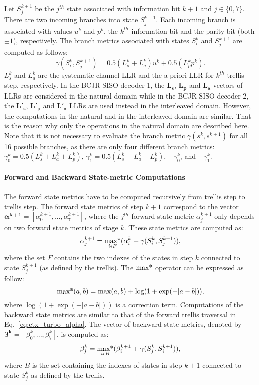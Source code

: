 Let $S_j^{k+1}$ be the $j^{th}$ state associated with information bit $k+1$ and
$j \in \{0,7\}$. There are two incoming branches into state $S_j^{k+1}$. Each
incoming branch is associated with values $u^k$ and $p^k$, the $k^{th}$
information bit and the parity bit (both $\pm1$), respectively. The branch
metrics associated with states $S_i^k$ and $S_j^{k+1}$ are computed as follows:
\begin{equation}
\label{eq:ctx_turbo_gamma}
 \gamma(S_i^k, S_j^{k+1}) = 0.5(L_{s}^k + L_a^k)u^k + 0.5(L_p^k p^k).
\end{equation}
$L_{s}^k$ and $L_a^k$ are the systematic channel LLR and the a priori LLR for
$k^{th}$ trellis step, respectively. In the BCJR SISO decoder 1, the
$\bm{L_{s}}$, $\bm{L_{p}}$ and $\bm{L_{a}}$ vectors of LLRs are considered
in the natural domain while in the BCJR SISO decoder 2, the $\bm{L'_{s}}$,
$\bm{L'_{p}}$ and $\bm{L'_{a}}$ LLRs are used instead in the interleaved domain.
However, the computations in the natural and in the interleaved domain are
similar. That is the reason why only the operations in the natural domain are
described here. Note that it is not necessary to evaluate the branch metric
$\gamma(s^k , s^{k+1})$ for all 16 possible branches, as there are only four
different branch metrics: $\gamma^k_0 = 0.5(L_{s}^k + L_a^k + L_p^k)$,
$\gamma^k_1 = 0.5(L_{s}^k + L_a^k - L_p^k)$, $-\gamma^k_0$, and $-\gamma^k_1$.

\paragraph{Forward and Backward State-metric Computations}

The forward state metrics have to be computed recursively from trellis step to
trellis step. The forward state metrics of step $k+1$ correspond to the vector
$\bm{\alpha^{k+1}} = [\alpha_0^{k+1}, ... ,\alpha_7^{k+1}]$, where the
$j^{th}$ forward state metric $\alpha_j^{k+1}$ only depends on two forward
state metrics of stage $k$. These state metrics are computed as:
\begin{equation}
  \label{eq:ctx_turbo_alpha}
  \alpha_j^{k+1} =
  \operatorname*{max*}_{i \epsilon F} ( \alpha_i^k + \gamma(S_i^k, S_j^{k+1}) ),
\end{equation}
where the set $F$ contains the two indexes of the states in step $k$ connected
to state $S_j^{k+1}$ (as defined by the trellis). The $\operatorname*{max*}$ operator can be
expressed as follow:
\begin{equation}
   \operatorname*{max*}(a,b) = \max(a,b) + \log(1 + \exp(-|a-b|)),
\end{equation}
where $\log(1 + \exp(-|a-b|))$ is a correction term.
Computations of the backward state metrics are similar to that of the forward
trellis traversal in Eq.~\ref{eq:ctx_turbo_alpha}. The vector of backward state
metrics, denoted by $\bm{\beta^k} = [\beta_0^k, ..., \beta_7^k]$, is
computed as:
\begin{equation}
  \label{eq:ctx_turbo_beta}
  \beta_j^k =
  \operatorname*{max*}_{i \epsilon B} ( \beta_i^{k+1} + \gamma(S_j^k, S_i^{k+1}) ),
\end{equation}
where $B$ is the set containing the indexes of states in step $k+1$ connected to
state $S_j^k$ as defined by the trellis.

